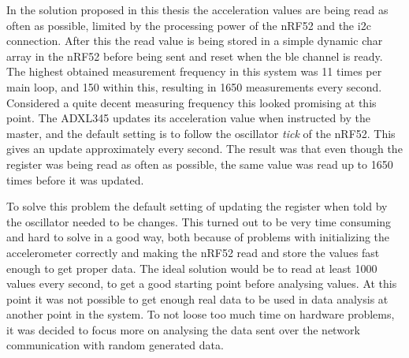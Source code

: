 \noindent In the solution proposed in this thesis the acceleration values are being read as often as possible, limited by the processing power of the \gls{nRF52} and the \gls{i2c} connection. After this the read value is being stored in a simple dynamic char array in the \gls{nRF52} before being sent and reset when the \gls{ble} channel is ready. The highest obtained measurement frequency in this system was 11 times per main loop, and 150 within this, resulting in 1650 measurements every second. Considered a quite decent measuring frequency this looked promising at this point. The \gls{ADXL345} updates its acceleration value when instructed by the master, and the default setting is to follow the oscillator \textit{tick} of the \gls{nRF52}. This gives an update approximately every second. The result was that even though the register was being read as often as possible, the same value was read up to 1650 times before it was updated. %



\noindent To solve this problem the default setting of updating the register when told by the oscillator needed to be changes. This turned out to be very time consuming and hard to solve in a good way, both because of problems with initializing the accelerometer correctly and making the nRF52 read and store the values fast enough to get proper data. The ideal solution would be to read at least 1000 values every second, to get a good starting point before analysing values. At this point it was not possible to get enough real data to be used in data analysis at another point in the system. To not loose too much time on hardware problems, it was decided to focus more on analysing the data sent over the network communication with random generated data. 


